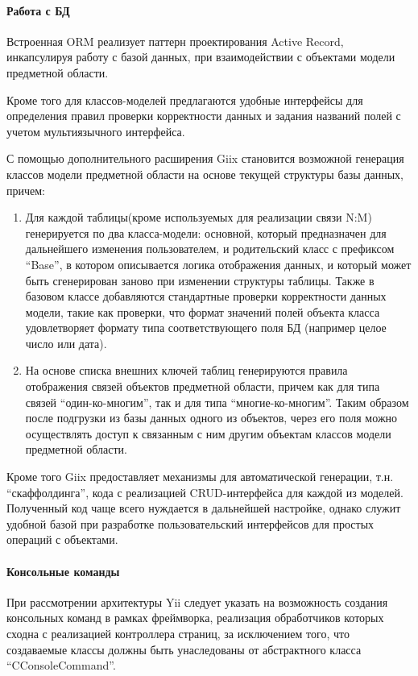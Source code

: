 \paragraph{Работа с БД}Встроенная ORM реализует паттерн проектирования Active Record\cite{fowler},
инкапсулируя работу с базой данных, при взаимодействии с объектами модели предметной области.

Кроме того для классов-моделей предлагаются удобные интерфейсы для определения правил проверки
корректности данных и задания названий полей с учетом мультиязычного интерфейса.

С помощью дополнительного расширения Giix\cite{giix} становится возможной генерация классов модели предметной
области на основе текущей структуры базы данных, причем:
\begin{enumerate}
\item{
  Для каждой таблицы(кроме используемых для реализации связи N:M) генерируется по два класса-модели:
  основной, который предназначен для дальнейшего изменения пользователем, и родительский класс 
  с префиксом ``Base'', в котором описывается логика отображения данных, и который может быть
  сгенерирован заново при изменении структуры таблицы. Также в базовом классе добавляются
  стандартные проверки корректности данных модели, такие как проверки, что формат значений полей объекта
  класса удовлетворяет формату типа соответствующего поля БД (например целое число или дата).
}
\item{
  На основе списка внешних ключей таблиц генерируются правила отображения связей объектов предметной области, 
  причем как для типа связей ``один-ко-многим'', так и для типа ``многие-ко-многим''.
  Таким образом после подгрузки из базы данных одного из объектов, через его поля можно осуществлять доступ
  к связанным с ним другим объектам классов модели предметной области.
}
\end{enumerate}

Кроме того Giix предоставляет механизмы для автоматической генерации, т.н. ``скаффолдинга'', кода с реализацией
CRUD-интерфейса для каждой из моделей. Полученный код чаще всего нуждается в дальнейшей настройке, однако 
служит удобной базой при разработке пользовательский интерфейсов для простых операций с объектами.

\paragraph{Консольные команды} При рассмотрении архитектуры Yii следует указать на возможность 
создания консольных команд в рамках фреймворка, реализация обработчиков которых сходна с 
реализацией контроллера страниц, за исключением того, что создаваемые классы должны быть унаследованы
от абстрактного класса ``CConsoleCommand''. 


